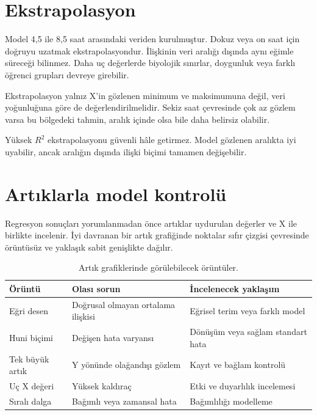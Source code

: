 \section{Ekstrapolasyon}

Model 4,5 ile 8,5 saat arasındaki veriden kurulmuştur. Dokuz veya on saat için
doğruyu uzatmak ekstrapolasyondur. İlişkinin veri aralığı dışında aynı eğimle
süreceği bilinmez. Daha uç değerlerde biyolojik sınırlar, doygunluk veya
farklı öğrenci grupları devreye girebilir.

Ekstrapolasyon yalnız X'in gözlenen minimum ve maksimumuna değil, veri
yoğunluğuna göre de değerlendirilmelidir. Sekiz saat çevresinde çok az gözlem
varsa bu bölgedeki tahmin, aralık içinde olsa bile daha belirsiz olabilir.

\begin{mistakebox}
Yüksek $R^2$ ekstrapolasyonu güvenli hâle getirmez. Model gözlenen aralıkta iyi
uyabilir, ancak aralığın dışında ilişki biçimi tamamen değişebilir.
\end{mistakebox}

\section{Artıklarla model kontrolü}

Regresyon sonuçları yorumlanmadan önce artıklar uydurulan değerler ve X ile
birlikte incelenir. İyi davranan bir artık grafiğinde noktalar sıfır çizgisi
çevresinde örüntüsüz ve yaklaşık sabit genişlikte dağılır.

\begin{table}[htbp]
\centering
\caption{Artık grafiklerinde görülebilecek örüntüler.}
\begin{tabular}{@{}p{}p{}p{}@{}}
\toprule
Örüntü & Olası sorun & İncelenecek yaklaşım \\
\midrule
Eğri desen & Doğrusal olmayan ortalama ilişkisi & Eğrisel terim veya farklı model \\
Huni biçimi & Değişen hata varyansı & Dönüşüm veya sağlam standart hata \\
Tek büyük artık & Y yönünde olağandışı gözlem & Kayıt ve bağlam kontrolü \\
Uç X değeri & Yüksek kaldıraç & Etki ve duyarlılık incelemesi \\
Sıralı dalga & Bağımlı veya zamansal hata & Bağımlılığı modelleme \\
\bottomrule
\end{tabular}
\end{table}

